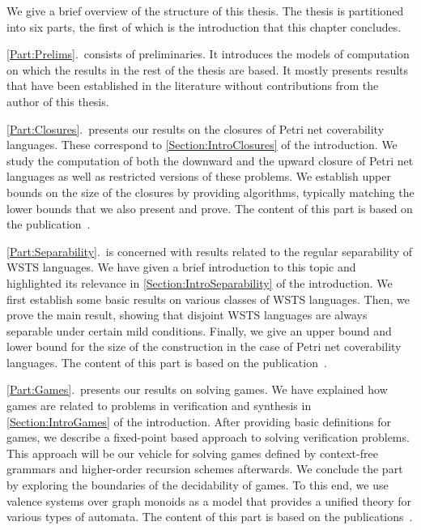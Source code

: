 \documentclass[../../diss.tex]{subfiles}
\begin{document}

We give a brief overview of the structure of this thesis.
The thesis is partitioned into six parts, the first of which is the introduction that this chapter concludes.

\cref{Part:Prelims}.~consists of preliminaries.
It introduces the models of computation on which the results in the rest of the thesis are based.
It mostly presents results that have been established in the literature without contributions from the author of this thesis.

\cref{Part:Closures}.~presents our results on the closures of Petri net coverability languages.
These correspond to \cref{Section:IntroClosures} of the introduction.
We study  the computation of both the downward and the upward closure of Petri net languages as well as restricted versions of these problems.
We establish upper bounds on the size of the closures by providing algorithms, typically matching the lower bounds that we also present and prove.
The content of this part is based on the publication~\cite{AtigMMS17}.

\cref{Part:Separability}.~is concerned with results related to the regular separability of WSTS languages.
We have given a brief introduction to this topic and highlighted its relevance in \cref{Section:IntroSeparability} of the introduction.
We first establish some basic results on various classes of WSTS languages.
Then, we prove the main result, showing that disjoint WSTS languages are always separable under certain mild conditions.
Finally, we give an upper bound and lower bound for the size of the construction in the case of Petri net coverability languages.
The content of this part is based on the publication~\cite{CzerwinskiLMMKS18}.

\cref{Part:Games}.~presents our results on solving games.
We have explained how games are related to problems in verification and synthesis in \cref{Section:IntroGames} of the introduction.
After providing basic definitions for games, we describe a fixed-point based approach to solving verification problems.
This approach will be our vehicle for solving games defined by context-free grammars and higher-order recursion schemes afterwards.
We conclude the part by exploring the boundaries of the decidability of games.
To this end, we use valence systems over graph monoids as a model that provides a unified theory for various types of automata.
The content of this part is based on the publications~\cite{HolikMM16,HagueMM17,MeyerMZ18,MeyerMN17a}.
\end{document}
